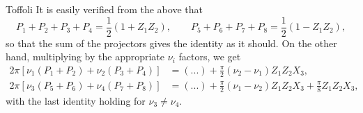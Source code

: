 \begin{tbox}[label=tcolorbox:toffoli]{Toffoli}
	It is easily verified from the above that
	\begin{equation*}
		P_1 + P_2 + P_3 + P_4 = \frac{1}{2} (1 + Z_1 Z_2),
		\qquad
		P_5 + P_6 + P_7 + P_8 = \frac{1}{2} (1 - Z_1 Z_2),
	\end{equation*}
	so that the sum of the projectors gives the identity as it should.
	On the other hand, multiplying by the appropriate $\nu_i$ factors, we get
	\begin{equation*}
	\begin{aligned}
		2\pi\left[\nu_1(P_1 + P_2) + \nu_2(P_3 + P_4)\right]
		&= (...) + \frac{\pi}{2} (\nu_2 - \nu_1) Z_1 Z_2 X_3, \\
		2\pi\left[\nu_3(P_5 + P_6) + \nu_4(P_7 + P_8)\right]
		&= (...) + \frac{\pi}{2} (\nu_1 - \nu_2) Z_1 Z_2 X_3 + \frac{\pi}{8} Z_1 Z_2 X_3,
	\end{aligned}
	\end{equation*}
	with the last identity holding for $\nu_3\neq \nu_4$.
\end{tbox}

